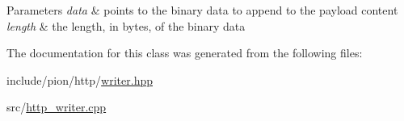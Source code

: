 \begin{DoxyParams}{Parameters}
{\em data} & points to the binary data to append to the payload content \\
\hline
{\em length} & the length, in bytes, of the binary data \\
\hline
\end{DoxyParams}


The documentation for this class was generated from the following files\-:\begin{DoxyCompactItemize}
\item 
include/pion/http/\hyperlink{writer_8hpp}{writer.\-hpp}\item 
src/\hyperlink{http__writer_8cpp}{http\-\_\-writer.\-cpp}\end{DoxyCompactItemize}
